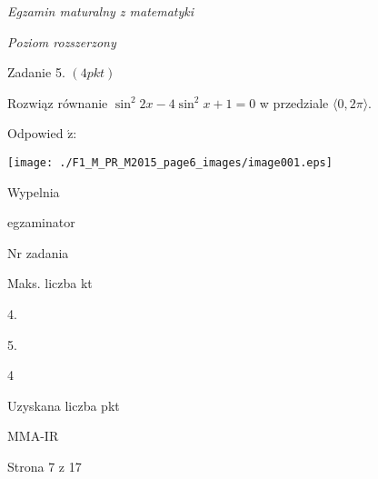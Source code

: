 \documentclass[a4paper,12pt]{article}
\begin{document}
{\it Egzamin maturalny z matematyki}

{\it Poziom rozszerzony}

Zadanie 5. $(4pkt)$

Rozwiąz równanie $\sin^{2}2x-4\sin^{2}x+1=0$ w przedziale $\langle 0,2\pi\rangle.$

Odpowied $\acute{\mathrm{z}}$:
\begin{center}
\texttt{[image: ./F1\_M\_PR\_M2015\_page6\_images/image001.eps]}
\end{center}
Wypelnia

egzaminator

Nr zadania

Maks. liczba kt

4.

5.

4

Uzyskana liczba pkt

MMA-IR

Strona 7 z 17
\end{document}
